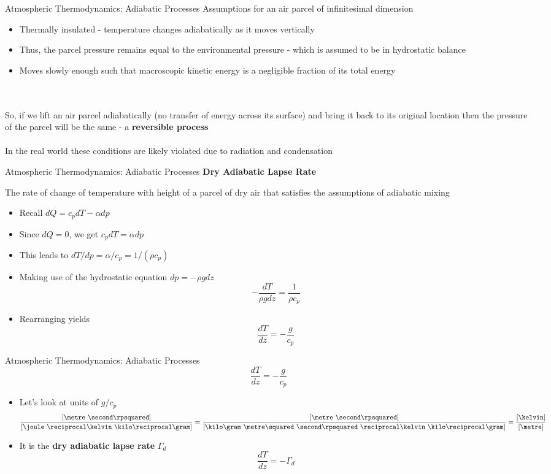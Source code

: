 \begin{frame}{Atmospheric Thermodynamics: Adiabatic Processes}
Assumptions for an air parcel of infinitesimal dimension
\begin{itemize}
	\item Thermally insulated - temperature changes adiabatically as it moves vertically
	\item Thus, the parcel pressure remains equal to the environmental pressure - which is assumed to be in hydrostatic balance
	\item Moves slowly enough such that macroscopic kinetic energy is a negligible fraction of its total energy
\end{itemize}
~\\~\\
So, if we lift an air parcel adiabatically (no transfer of energy across its surface) and bring it back to its original location then the pressure of the parcel will be the same - a \textbf{reversible process}
~\\~\\
In the real world these conditions are likely violated due to radiation and condensation
\end{frame}
\begin{frame}{Atmospheric Thermodynamics: Adiabatic Processes}
\textbf{Dry Adiabatic Lapse Rate}
\begin{fancydefs}
	The rate of change of temperature with height of a parcel of dry air that satisfies the assumptions of adiabatic mixing
\end{fancydefs}
\begin{itemize}
	\item Recall $dQ = c_pdT - \alpha dp$
	\item Since $dQ=0$, we get $c_pdT = \alpha dp$
	\item This leads to $dT/dp = \alpha/c_p = 1/(\rho c_p)$
	\item Making use of the hydrostatic equation $dp=-\rho g dz$
	$$-\frac{dT}{\rho g dz} = \frac{1}{\rho c_p}$$
	\item Rearranging yields
	$$\frac{dT}{dz} = -\frac{g}{c_p}$$
\end{itemize}
\end{frame}
\begin{frame}{Atmospheric Thermodynamics: Adiabatic Processes}
$$\frac{dT}{dz} = -\boxed{\frac{g}{c_p}}$$
\begin{itemize}
	\item Let's look at units of $g/c_p$
	$$\frac{[\metre\ \second\rpsquared]}{[\joule\ \reciprocal\kelvin\ \kilo\reciprocal\gram]} = \frac{[\metre\ \second\rpsquared]}{[\kilo\gram\ \metre\squared\ \second\rpsquared\ \reciprocal\kelvin\ \kilo\reciprocal\gram]} = \frac{[\kelvin]}{[\metre]}$$
	\item It is the \textbf{dry adiabatic lapse rate} $\Gamma_d$
	$$ \frac{dT}{dz} = -\Gamma_d$$
\end{itemize}
\end{frame}
